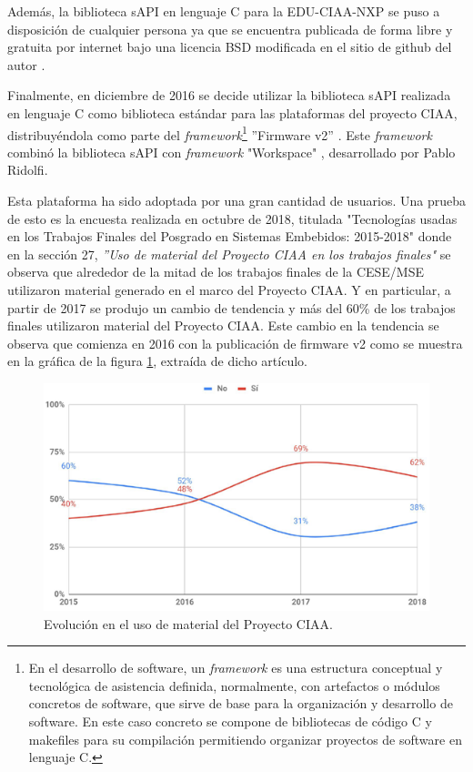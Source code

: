 Además, la biblioteca sAPI en lenguaje C para la EDU-CIAA-NXP se puso a disposición de cualquier persona ya que se encuentra publicada de forma libre y gratuita por internet bajo una licencia BSD modificada \citep{BSD3clause} en el sitio de github del autor \citep{sAPIgit}.

Finalmente, en diciembre de 2016 se decide utilizar la biblioteca sAPI realizada en lenguaje C como biblioteca estándar para las plataformas del proyecto CIAA, distribuyéndola como parte del \emph{framework}\footnote{En el desarrollo de software, un \emph{framework} es una estructura conceptual y tecnológica de asistencia definida, normalmente, con artefactos o módulos concretos de software, que sirve de base para la organización y desarrollo de software. En este caso concreto se compone de bibliotecas de código C y makefiles para su compilación permitiendo organizar proyectos de software en lenguaje C.} ''Firmware v2'' \citep{ciaaFirmwareV2}. Este \emph{framework} combinó la biblioteca sAPI con \emph{framework} "Workspace" \citep{ws-ridolfi}, desarrollado por Pablo Ridolfi.

Esta plataforma ha sido adoptada por una gran cantidad de usuarios. Una prueba de esto es la encuesta realizada en octubre de 2018, titulada "Tecnologías usadas en los Trabajos Finales del Posgrado en Sistemas Embebidos: 2015-2018" \citep{EncuestaCeseMse} donde en la sección 27, \emph{''Uso de material del Proyecto CIAA en los trabajos finales"} se observa que alrededor de la mitad de los trabajos finales de la CESE/MSE utilizaron material generado en el marco del Proyecto CIAA. Y en particular, a partir de 2017 se produjo un cambio de tendencia y más del 60\% de los trabajos finales utilizaron material del Proyecto CIAA. Este cambio en la tendencia se observa que comienza en 2016 con la publicación de firmware v2 como se muestra en la gráfica de la figura \ref{fig:tendenciaMaterialCiaa}, extraída de dicho artículo.

\begin{figure}[!htbp]
\begin{center}  %
\includegraphics*[width=12cm]{Figures/TendenciaMaterialCiaa.png}
\par\caption{Evolución en el uso de material del Proyecto CIAA.}\label{fig:tendenciaMaterialCiaa}
\end{center}
\end{figure}


